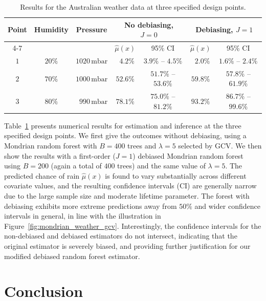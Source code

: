 \documentclass[11pt,lof]{puthesis}
\theoremstyle{break}
\theoremstyle{proof}
\begin{document}
\begin{table}[t]
  \centering
  \begin{tabular}{|c|c|c|c|c|c|c|}
    \hline
    \multirow{2}{*}{Point}
    & \multirow{2}{*}{Humidity}
    & \multirow{2}{*}{Pressure}
    & \multicolumn{2}{|c|}{No debiasing, $J=0$}
    & \multicolumn{2}{|c|}{Debiasing, $J=1$} \\
    \cline{4-7}
    & &
    & $\hat\mu(x)$ & 95\% CI
    & $\hat\mu(x)$ & 95\% CI \\
    \hline
    $1$ & $20\%$ & $1020\,\textrm{mbar}$ &
    $\phantom{0}4.2\%$ &
    $3.9\%$ -- $4.5\%$ &
    $\phantom{0}2.0\%$ &
    $1.6\%$ -- $2.4\%$ \\
    $2$ & $70\%$ & $1000\,\textrm{mbar}$ &
    $52.6\%$ &
    $51.7\%$ -- $53.6\%$ &
    $59.8\%$ &
    $57.8\%$ -- $61.9\%$ \\
    $3$ & $80\%$ & $\phantom{1}990\,\textrm{mbar}$ &
    $78.1\%$ &
    $75.0\%$ -- $81.2\%$ &
    $93.2\%$ &
    $86.7\%$ -- $99.6\%$ \\
    \hline
  \end{tabular}
  \caption[Results for the Australian weather data]{
    Results for the Australian weather data
  at three specified design points.}
  \label{tab:mondrian_weather_ci}
\end{table}

Table~\ref{tab:mondrian_weather_ci} presents numerical results for estimation
and inference at the three specified design points. We first give the outcomes
without debiasing, using a Mondrian random forest with $B = 400$ trees and
$\lambda = 5$ selected by GCV. We then show the results with a first-order
($J=1$) debiased Mondrian random forest using $B = 200$ (again a total of $400$
trees) and the same value of $\lambda = 5$. The predicted chance of rain
$\hat\mu(x)$ is found to vary substantially across different covariate values,
and the resulting confidence intervals (CI) are generally narrow due to the
large sample size and moderate lifetime parameter. The forest with debiasing
exhibits more extreme predictions away from $50\%$ and wider confidence
intervals in general, in line with the illustration in
Figure~\ref{fig:mondrian_weather_gcv}. Interestingly, the confidence intervals
for the non-debiased and debiased estimators do not intersect, indicating that
the original estimator is severely biased, and providing further justification
for our modified debiased random forest estimator.

\section{Conclusion}%
\label{sec:mondrian_conclusion}
\end{document}
